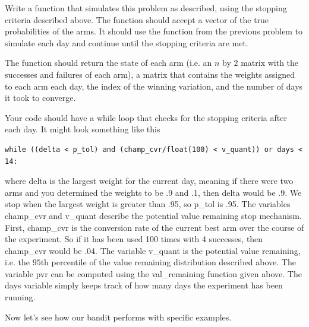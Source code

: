 \begin{problem}
Write a function that simulates this problem as described, using the stopping criteria described above.  The function should accept a vector of the true probabilities of the arms.  It should use the function from the previous problem to simulate each day and continue until the stopping criteria are met.

The function should return the state of each arm (i.e. an $n$ by $2$ matrix with the successes and failures of each arm), a matrix that contains the weights assigned to each arm each day, the index of the winning variation, and the number of days it took to converge.

Your code should have a while loop that checks for the stopping criteria after each day.  It might look something like this
\newpage
\begin{lstlisting}[style = python]
while ((delta < p_tol) and (champ_cvr/float(100) < v_quant)) or days < 14:
\end{lstlisting}
where delta is the largest weight for the current day, meaning if there were two arms and you determined the weights to be .9 and .1, then delta would be .9.  We stop when the largest weight is greater than .95, so p\_tol is .95.  The variables champ\_cvr and v\_quant describe the potential value remaining stop mechanism.  First, champ\_cvr is the conversion rate of the current best arm over the course of the experiment.  So if it has been used 100 times with 4 successes, then champ\_cvr would be .04.  The variable v\_quant is the potential value remaining, i.e. the $95$th percentile of the value remaining distribution described above.  The variable pvr can be computed using the val\_remaining function given above.
The days variable simply keeps track of how many days the experiment has been running.
\end{problem}

Now let's see how our bandit performs with specific examples.

